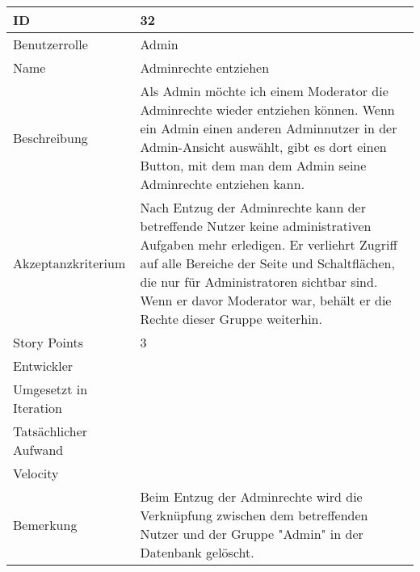 \begin{tabularx}{\textwidth}{|p{}|X|}
	\hline
	ID & 32 \\
	\hline
	Benutzerrolle & Admin \\
	\hline
	Name & Adminrechte entziehen\\
	\hline
	Beschreibung & Als Admin möchte ich einem Moderator die Adminrechte wieder entziehen können. Wenn ein Admin einen anderen Adminnutzer in der Admin-Ansicht auswählt, gibt es dort einen Button, mit dem man dem Admin seine Adminrechte entziehen kann.  \\
	\hline
	Akzeptanzkriterium & Nach Entzug der Adminrechte kann der betreffende Nutzer keine administrativen Aufgaben mehr erledigen. Er verliehrt Zugriff auf alle Bereiche der Seite und Schaltflächen, die nur für Administratoren sichtbar sind. Wenn er davor Moderator war, behält er die Rechte dieser Gruppe weiterhin. \\
	\hline
	Story Points & 3 \\
	\hline
	Entwickler &  \\
	\hline
	Umgesetzt in Iteration & \\
	\hline
	Tatsächlicher Aufwand & \\
	\hline
	Velocity & \\
	\hline
	Bemerkung & Beim Entzug der Adminrechte wird die Verknüpfung zwischen dem betreffenden Nutzer und der Gruppe "Admin" in der Datenbank gelöscht.\\
	\hline
\end{tabularx}
\vspace{20pt}
